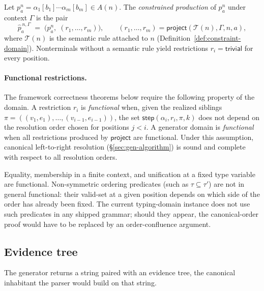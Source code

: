 \begin{definition}
\label{def:cstr-prod}
Let \(p_a^n = \alpha_1[b_1]\cdots\alpha_m[b_m] \in A(n)\). The
\emph{constrained production} of \(p_a^n\) under context \(\Gamma\) is the
pair
\[
  \widehat{p}^{\,n,\Gamma}_a
  \;=\;
  \bigl(p_a^n,\; (r_1,\ldots,r_m)\bigr),
  \qquad
  (r_1,\ldots,r_m) = \mathsf{project}(\mathcal{T}(n), \Gamma, n, a),
\]
where \(\mathcal{T}(n)\) is the semantic rule attached to \(n\)
(Definition~\ref{def:constraint-domain}). Nonterminals without a semantic
rule yield restrictions \(r_i = \mathsf{trivial}\) for every position.
\end{definition}

\paragraph{Functional restrictions.}
\label{par:gen-functional}
The framework correctness theorems below require the following property of
the domain. A restriction \(r_i\) is \emph{functional} when, given the
realized siblings \(\pi = ((v_1, e_1), \ldots, (v_{i-1}, e_{i-1}))\), the set
\(\mathsf{step}(\alpha_i, r_i, \pi, k)\) does not depend on the resolution
order chosen for positions \(j < i\). A generator domain is \emph{functional}
when all restrictions produced by \(\mathsf{project}\) are functional. Under
this assumption, canonical left-to-right resolution
(\S\ref{sec:gen-algorithm}) is sound and complete with respect to all
resolution orders.

\begin{remark}
\label{rem:gen-symmetric}
Equality, membership in a finite context, and unification at a fixed type
variable are functional. Non-symmetric ordering predicates (such as
\(\tau \subseteq \tau'\)) are not in general functional: their valid-set at a
given position depends on which side of the order has already been fixed.
The current typing-domain instance does not use such predicates in any
shipped grammar; should they appear, the canonical-order proof would have to
be replaced by an order-confluence argument.
\end{remark}

\subsection{Evidence tree}
\label{sec:gen-evtree}

The generator returns a string paired with an evidence tree, the canonical
inhabitant the parser would build on that string.

